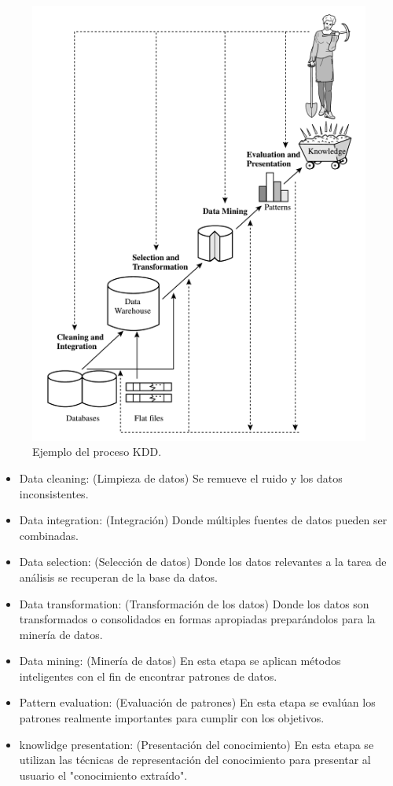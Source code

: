 \begin{figure}[htb]
	\label{Figura3}
	\begin{center}
		\includegraphics[scale=0.6]{imagenes/kdd2.png}
	\end{center}
	\caption{Ejemplo del proceso KDD.}
\end{figure}

\begin{itemize}
	\item Data cleaning: (Limpieza de datos) Se remueve el ruido y los datos inconsistentes.
	\item Data integration: (Integración) Donde múltiples fuentes de datos pueden ser combinadas.
	\item Data selection: (Selección de datos)  Donde los datos relevantes a la tarea de análisis se recuperan de la base da datos.
	\item Data transformation: (Transformación de los datos) Donde los datos son transformados o consolidados en formas apropiadas preparándolos para la minería de datos.
	\item Data mining: (Minería de datos) En esta etapa se aplican métodos inteligentes con el fin de encontrar patrones de datos. 
	\item Pattern evaluation: (Evaluación de patrones) En esta etapa se evalúan los patrones realmente importantes para cumplir con los objetivos. 
	\item knowlidge presentation: (Presentación del conocimiento) En esta etapa se utilizan las técnicas de representación del conocimiento para presentar al usuario el "conocimiento extraído". 
\end{itemize}

